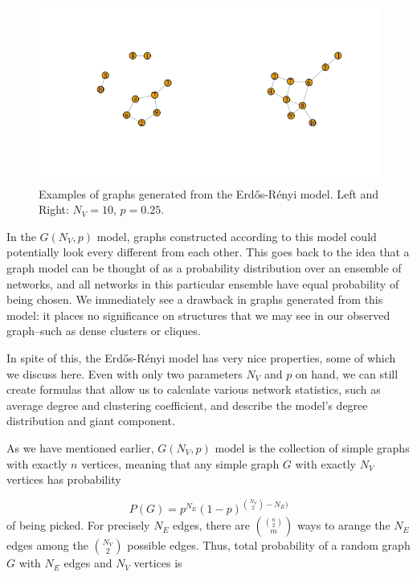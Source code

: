 \documentclass[12pt,twoside]{amherstthesis}
\begin{document}
  \begin{figure}[htbp]
  \centering
  \includegraphics{figure/21erdosrenyiexample.png}
  \caption{Examples of graphs generated from the Erdős-Rényi model. Left
  and Right: \(N_V = 10\), \(p = 0.25\).}
  \end{figure}
  
  In the \(G(N_V, p)\) model, graphs constructed according to this model
  could potentially look every different from each other. This goes back
  to the idea that a graph model can be thought of as a probability
  distribution over an ensemble of networks, and all networks in this
  particular ensemble have equal probability of being chosen. We
  immediately see a drawback in graphs generated from this model: it
  places no significance on structures that we may see in our observed
  graph--such as dense clusters or cliques.
  
  In spite of this, the Erdős-Rényi model has very nice properties, some
  of which we discuss here. Even with only two parameters \(N_{V}\) and
  \(p\) on hand, we can still create formulas that allow us to calculate
  various network statistics, such as average degree and clustering
  coefficient, and describe the model's degree distribution and giant
  component.
  
  As we have mentioned earlier, \(G(N_V, p)\) model is the collection of
  simple graphs with exactly \(n\) vertices, meaning that any simple graph
  \(G\) with exactly \(N_V\) vertices has probability
  
  \[P(G) = p^{N_E}(1 - p)^{{N_V \choose 2} - N_E)}\] of being picked. For
  precisely \(N_E\) edges, there are \({{n \choose 2} \choose m}\) ways to
  arange the \(N_{E}\) edges among the \({N_V \choose 2}\) possible edges.
  Thus, total probability of a random graph \(G\) with \(N_{E}\) edges and
  \(N_{V}\) vertices is
  
\end{document}
